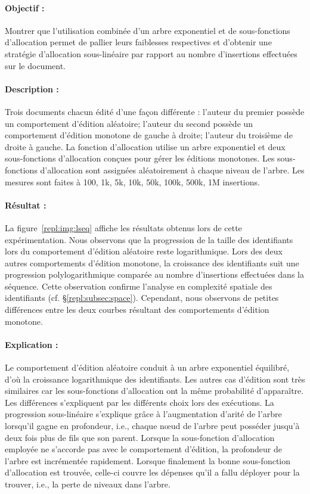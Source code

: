 \paragraph{Objectif :} Montrer que l'utilisation combinée d'un arbre exponentiel
et de sous-fonctions d'allocation permet de pallier leurs faiblesses respectives
et d'obtenir une stratégie d'allocation sous-linéaire par rapport au nombre
d'insertions effectuées sur le document.

\paragraph{Description :} Trois documents chacun édité d'une façon différente :
l'auteur du premier possède un comportement d'édition aléatoire; l'auteur du
second possède un comportement d'édition monotone de gauche à droite; l'auteur
du troisième de droite à gauche. La fonction d'allocation utilise un arbre
exponentiel et deux sous-fonctions d'allocation conçues pour gérer les éditions
monotones. Les sous-fonctions d'allocation sont assignées aléatoirement à chaque
niveau de l'arbre. Les mesures sont faites à 100, 1k, 5k, 10k, 50k, 100k, 500k,
1M insertions.

\paragraph{Résultat :} La figure~\ref{repl:img:lseq} affiche les résultats
obtenus lors de cette expérimentation. Nous observons que la progression de la
taille des identifiants lors du comportement d'édition aléatoire reste
logarithmique. Lors des deux autres comportements d'édition monotone, la
croissance des identifiants suit une progression polylogarithmique comparée au
nombre d'insertions effectuées dans la séquence. Cette observation confirme
l'analyse en complexité spatiale des identifiants
(cf. §\ref{repl:subsec:space}). Cependant, nous observons de petites
différences entre les deux courbes résultant des comportements d'édition monotone.

\paragraph{Explication :} Le comportement d'édition aléatoire conduit à un arbre
exponentiel équilibré, d'où la croissance logarithmique des identifiants. Les
autres cas d'édition sont très similaires car les sous-fonctions d'allocation
ont la même probabilité d'apparaître. Les différences s'expliquent par les
différents choix lors des exécutions. La progression sous-linéaire s'explique
grâce à l'augmentation d'arité de l'arbre lorsqu'il gagne en profondeur, i.e.,
chaque nœud de l'arbre peut posséder jusqu'à deux fois plus de fils que son
parent. Lorsque la sous-fonction d'allocation employée ne s'accorde pas avec le
comportement d'édition, la profondeur de l'arbre est incrémentée
rapidement. Lorsque finalement la bonne sous-fonction d'allocation est trouvée,
celle-ci couvre les dépenses qu'il a fallu déployer pour la trouver, i.e., la
perte de niveaux dans l'arbre.

